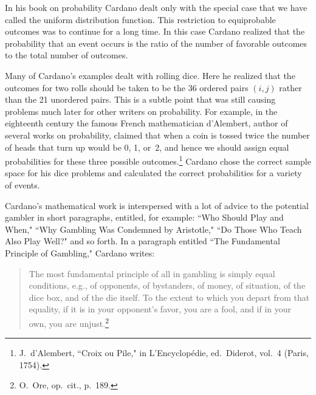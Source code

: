 In his book on probability Cardano dealt only with the special case that we
have called the uniform distribution function.  This restriction to equiprobable outcomes
was
to continue for a long time.  In this case Cardano realized that the
probability that an event occurs is the ratio of the number of favorable
outcomes to the total number of outcomes.

Many of Cardano's examples dealt with rolling dice.  Here he realized that
the
outcomes for two rolls should be taken to be the 36 ordered pairs $(i,j)$
rather than the 21 unordered pairs.  This is a subtle point that was still
causing problems much later for other writers on probability.  For example,
in
the eighteenth century the famous French mathematician d'Alembert, author of
several works on probability, claimed that when a coin is tossed twice
the number of heads that turn up would be 0, 1, or~2, and hence we should
assign equal probabilities for these three possible
outcomes.\footnote{J.~d'Alembert, ``Croix ou Pile," in \emx
{L'Encyclop\'edie,}
ed.~Diderot, vol.~4 (Paris, 1754).}  Cardano chose the correct sample space
for
his dice problems and calculated the correct probabilities for a variety of
events.
\par
Cardano's mathematical work is interspersed with a lot of advice to the
potential gambler in short paragraphs, entitled, for example: ``Who Should
Play
and When," ``Why Gambling Was Condemned by Aristotle," ``Do Those Who Teach
Also Play Well?" and so forth.  In a paragraph entitled ``The Fundamental
Principle of Gambling," Cardano writes:
\begin{quote}
The most fundamental principle of all in gambling is simply equal conditions,
e.g., of opponents, of bystanders, of money, of situation, of the dice box,
and
of the die itself.  To the extent to which you depart from that equality, if
it
is in your opponent's favor, you are a fool, and if in your own, you are
unjust.\footnote{O.~Ore, op.\ cit., p.~189.}
\end{quote}

